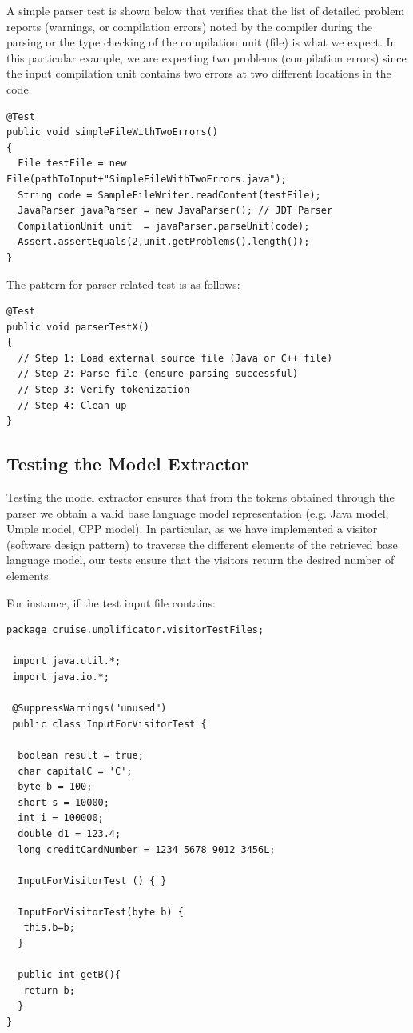 A simple parser test is shown below that verifies that the list of detailed problem reports (warnings, or compilation errors) noted by the compiler during the parsing or the type checking of the compilation unit (file) is what we expect.
In this particular example, we are expecting two problems (compilation errors) since the input compilation unit contains two errors at two different locations in the code.

\begin{lstlisting}[style=java]
@Test
public void simpleFileWithTwoErrors()
{
  File testFile = new File(pathToInput+"SimpleFileWithTwoErrors.java");
  String code = SampleFileWriter.readContent(testFile);
  JavaParser javaParser = new JavaParser(); // JDT Parser
  CompilationUnit unit  = javaParser.parseUnit(code);
  Assert.assertEquals(2,unit.getProblems().length());
}
\end{lstlisting}

The pattern for parser-related test is as follows:

\begin{lstlisting}[style=java]
@Test
public void parserTestX()
{
  // Step 1: Load external source file (Java or C++ file)
  // Step 2: Parse file (ensure parsing successful) 
  // Step 3: Verify tokenization
  // Step 4: Clean up
}
\end{lstlisting}

\subsection{Testing the Model Extractor}

Testing the model extractor ensures that from the tokens obtained through the parser we obtain a valid base language model representation (e.g. Java model, Umple model, CPP model). In particular, as we have implemented a visitor (software design pattern) to traverse the different elements of the retrieved base language model, our tests ensure that the visitors return the desired number of elements.


For instance, if the test input file contains: 

\begin{lstlisting}[style=java, label={lst:inputVisitor}, caption=Java input file for test.]
package cruise.umplificator.visitorTestFiles;

 import java.util.*;
 import java.io.*;

 @SuppressWarnings("unused")
 public class InputForVisitorTest { 

  boolean result = true;
  char capitalC = 'C';
  byte b = 100;
  short s = 10000;
  int i = 100000;
  double d1 = 123.4;
  long creditCardNumber = 1234_5678_9012_3456L;

  InputForVisitorTest () { }

  InputForVisitorTest(byte b) {
   this.b=b;
  }

  public int getB(){
   return b;
  }
}
\end{lstlisting}

